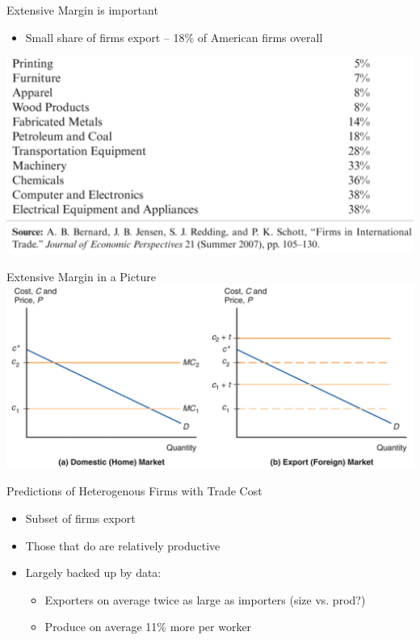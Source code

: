 \documentclass{beamer}
\begin{document}
\begin{frame}{Extensive Margin is important} 
    \begin{itemize}
        \item Small share of firms export -- 18\% of American firms overall 
    \end{itemize}
    \includegraphics[scale=0.20]{bjrs_firms.png}
\end{frame}

\begin{frame}{Extensive Margin in a Picture} 
    \includegraphics[scale=0.20]{trade_costs_firms.png}
\end{frame}

\begin{frame}{Predictions of Heterogenous Firms with Trade Cost}
    \begin{itemize}
        \item Subset of firms export
        \item Those that do are relatively productive
        \item Largely backed up by data:
        \begin{itemize}
            \item Exporters on average twice as large as importers (size vs. prod?)
            \item Produce on average 11\% more per worker
        \end{itemize}
    \end{itemize}
\end{frame}
\end{document}
